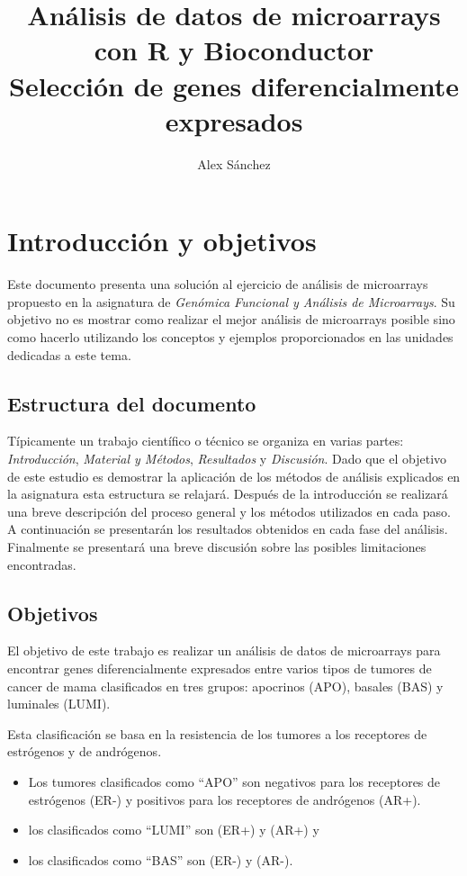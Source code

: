 \documentclass[a4paper]{article}\usepackage[]{graphicx}\usepackage[]{color}
\title{Análisis de datos de microarrays con R y Bioconductor\\
Selección de genes diferencialmente expresados}
\author{Alex Sánchez}
\begin{document}

\maketitle

\tableofcontents

\section{Introducción y objetivos}

Este documento presenta una solución al ejercicio de análisis de microarrays propuesto en la asignatura de \emph{Genómica Funcional y Análisis de Microarrays}. Su objetivo no es mostrar como realizar el mejor análisis de microarrays posible sino como hacerlo utilizando los conceptos y ejemplos proporcionados en las unidades dedicadas a este tema.

\subsection{Estructura del documento}

Típicamente un trabajo científico o técnico se organiza en varias partes: \emph{Introducción}, \emph{Material y Métodos}, \emph{Resultados} y \emph{Discusión}. Dado que el objetivo de este estudio es demostrar la aplicación de los métodos de análisis explicados en la asignatura esta estructura se relajará. Después de la introducción se realizará una breve descripción del proceso general y los métodos utilizados en cada paso. A continuación se presentarán los resultados obtenidos en cada fase del análisis. Finalmente se presentará una breve discusión sobre las posibles limitaciones encontradas.

\subsection{Objetivos}

El objetivo de este trabajo es realizar un análisis de datos de microarrays 
para encontrar genes diferencialmente expresados entre varios tipos de tumores de cancer de mama clasificados en tres grupos: apocrinos (APO), basales (BAS) y luminales (LUMI). 

Esta clasificación se basa en la resistencia de los tumores a los receptores de estrógenos y de andrógenos. 
\begin{itemize}
\item Los tumores clasificados como ``APO'' son negativos para los receptores de estrógenos (ER-) y positivos para los receptores de andrógenos (AR+).
\item  los clasificados como ``LUMI'' son (ER+) y (AR+) y
\item los clasificados como ``BAS'' son (ER-) y (AR-).
\end{itemize}
\end{document}
